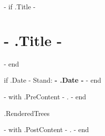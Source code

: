 \documentclass[10pt,paper=a4,ngerman,DIV=15,BCOR=0mm,%
{{ if .DocumentOptions -}}
{{ .DocumentOptions }}%
{{- end -}}
]{scrartcl}
\begin{document}
{{- if .Title -}}
\section*{ {{- .Title -}} }
{{- end }}

{{ if .Date -}}
Stand: \textbf{ {{- .Date -}} }
{{- end }}


{{- with .PreContent -}}
{{ . }}
{{- end }}


{{ .RenderedTrees }}


{{- with .PostContent -}}
{{ . }}
{{- end }}
\end{document}
